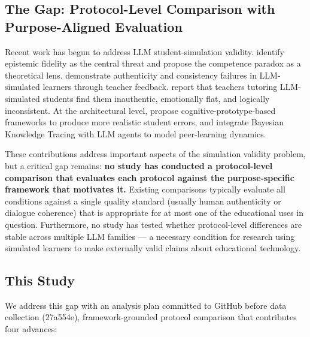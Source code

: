 \documentclass[12pt]{article}
\begin{document}
\subsection{The Gap: Protocol-Level Comparison with Purpose-Aligned Evaluation}

Recent work has begun to address LLM student-simulation validity.
\citet{yuan2026} identify epistemic fidelity as the central threat and propose
the competence paradox as a theoretical lens.
\citet{mannekote2025} demonstrate authenticity and consistency failures in LLM-simulated
learners through teacher feedback.
\citet{bea2025_teacher} report that teachers tutoring LLM-simulated students find them
inauthentic, emotionally flat, and logically inconsistent.
At the architectural level, \citet{embracing2025} propose cognitive-prototype-based
frameworks to produce more realistic student errors, and \citet{peers2025} integrate
Bayesian Knowledge Tracing with LLM agents to model peer-learning dynamics.

These contributions address important aspects of the simulation validity problem, but a
critical gap remains: \textbf{no study has conducted a protocol-level comparison that
evaluates each protocol against the purpose-specific framework that motivates it.}
Existing comparisons typically evaluate all conditions against a single quality standard
(usually human authenticity or dialogue coherence) that is appropriate for at most one
of the educational uses in question.
Furthermore, no study has tested whether protocol-level differences are stable across
multiple LLM families --- a necessary condition for research using simulated learners
to make externally valid claims about educational technology.

\subsection{This Study}

We address this gap with an analysis plan committed to GitHub before data collection (27a554e), framework-grounded
protocol comparison that contributes four advances:
\end{document}
